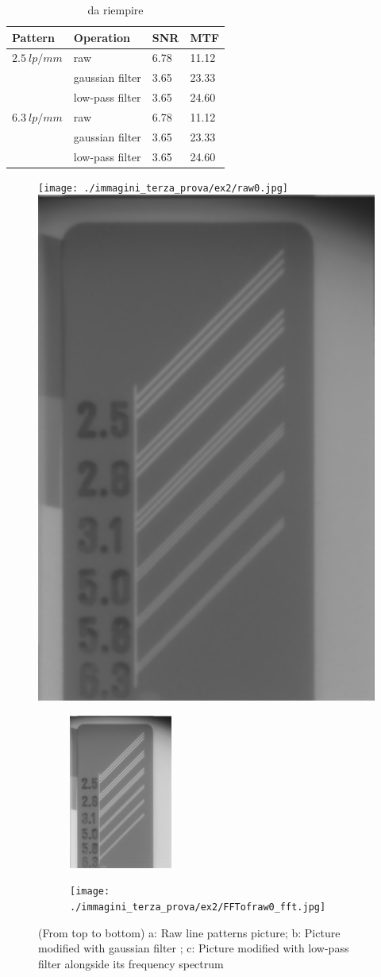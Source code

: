 \documentclass{article}
\begin{document}
\begin{table}[h]
	\begin {center}
	\begin{tabular}{| l | l | l | l | }
		\hline
		Pattern & Operation & SNR & MTF \\ \hline
		$2.5\ lp/mm$& raw & 6.78 & 11.12 \\ \hline
		& gaussian filter & 3.65 & 23.33 \\ \hline 
		& low-pass filter & 3.65 & 24.60 \\ \hline 
		$6.3\ lp/mm$& raw & 6.78 & 11.12 \\ \hline
		& gaussian filter & 3.65 & 23.33 \\ \hline 
		& low-pass filter & 3.65 & 24.60 \\ \hline 
	\end{tabular}
	\caption{da riempire}
\end{center}
\end{table}
\clearpage
\begin{figure}[h]
	\centering
	\texttt{[image: ./immagini\_terza\_prova/ex2/raw0.jpg]}
	\bigbreak
	\includegraphics[width=.33\textwidth]{./immagini_terza_prova/ex2/gaussian.jpg}
	\bigbreak
	\begin{subfigure}[b]{0.5\textwidth}
		\centering
		\includegraphics[height=2in]{./immagini_terza_prova/ex2/raw0_fft.jpg}
		
	\end{subfigure}%
	\begin{subfigure}[b]{0.5\textwidth}
		\centering
		\texttt{[image: ./immagini\_terza\_prova/ex2/FFTofraw0\_fft.jpg]}
		
	\end{subfigure}%
	
	\bigbreak
	
	\caption{ (From top to bottom) a: Raw line patterns picture; b: Picture modified with gaussian filter  ; c: Picture modified with low-pass filter alongside its frequency spectrum}\label{two}
\end{figure}
\end{document}
